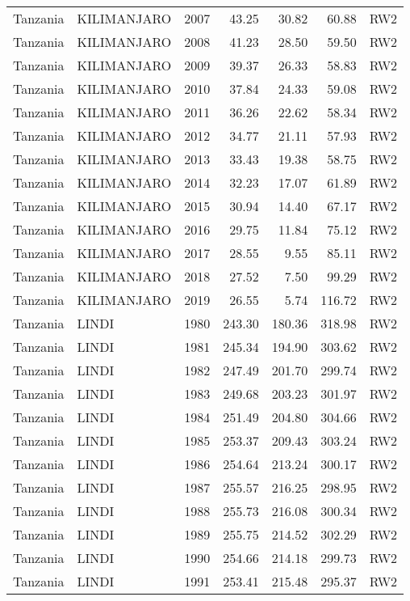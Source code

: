 \begin{longtable}{lllrrrl}
  Tanzania & KILIMANJARO & 2007 & 43.25 & 30.82 & 60.88 & RW2 \\ 
  Tanzania & KILIMANJARO & 2008 & 41.23 & 28.50 & 59.50 & RW2 \\ 
  Tanzania & KILIMANJARO & 2009 & 39.37 & 26.33 & 58.83 & RW2 \\ 
  Tanzania & KILIMANJARO & 2010 & 37.84 & 24.33 & 59.08 & RW2 \\ 
  Tanzania & KILIMANJARO & 2011 & 36.26 & 22.62 & 58.34 & RW2 \\ 
  Tanzania & KILIMANJARO & 2012 & 34.77 & 21.11 & 57.93 & RW2 \\ 
  Tanzania & KILIMANJARO & 2013 & 33.43 & 19.38 & 58.75 & RW2 \\ 
  Tanzania & KILIMANJARO & 2014 & 32.23 & 17.07 & 61.89 & RW2 \\ 
  Tanzania & KILIMANJARO & 2015 & 30.94 & 14.40 & 67.17 & RW2 \\ 
  Tanzania & KILIMANJARO & 2016 & 29.75 & 11.84 & 75.12 & RW2 \\ 
  Tanzania & KILIMANJARO & 2017 & 28.55 & 9.55 & 85.11 & RW2 \\ 
  Tanzania & KILIMANJARO & 2018 & 27.52 & 7.50 & 99.29 & RW2 \\ 
  Tanzania & KILIMANJARO & 2019 & 26.55 & 5.74 & 116.72 & RW2 \\ 
  Tanzania & LINDI & 1980 & 243.30 & 180.36 & 318.98 & RW2 \\ 
  Tanzania & LINDI & 1981 & 245.34 & 194.90 & 303.62 & RW2 \\ 
  Tanzania & LINDI & 1982 & 247.49 & 201.70 & 299.74 & RW2 \\ 
  Tanzania & LINDI & 1983 & 249.68 & 203.23 & 301.97 & RW2 \\ 
  Tanzania & LINDI & 1984 & 251.49 & 204.80 & 304.66 & RW2 \\ 
  Tanzania & LINDI & 1985 & 253.37 & 209.43 & 303.24 & RW2 \\ 
  Tanzania & LINDI & 1986 & 254.64 & 213.24 & 300.17 & RW2 \\ 
  Tanzania & LINDI & 1987 & 255.57 & 216.25 & 298.95 & RW2 \\ 
  Tanzania & LINDI & 1988 & 255.73 & 216.08 & 300.34 & RW2 \\ 
  Tanzania & LINDI & 1989 & 255.75 & 214.52 & 302.29 & RW2 \\ 
  Tanzania & LINDI & 1990 & 254.66 & 214.18 & 299.73 & RW2 \\ 
  Tanzania & LINDI & 1991 & 253.41 & 215.48 & 295.37 & RW2 \\ 

\end{longtable}
